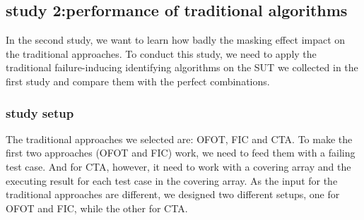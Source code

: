 \documentclass{sig-alternate}
\begin{document}
%
%

\subsection{study 2:performance of traditional algorithms}
In the second study, we want to learn how badly the masking effect impact on the traditional approaches. To conduct this study, we need to apply the traditional failure-inducing identifying algorithms on the SUT we collected in the first study and compare them with the perfect combinations.


%


\subsubsection{study setup}
The traditional approaches we selected are: OFOT, FIC and CTA. To make the first two approaches (OFOT and FIC) work, we need to feed them with a failing test case. And for CTA, however, it need to work with a covering array and the executing result for each test case in the covering array. As the input for the traditional approaches are different, we designed two different setups, one for OFOT and FIC, while the other for CTA.
\end{document}
